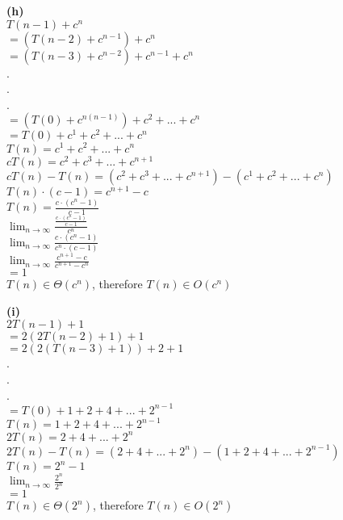 \documentclass[a4paper, 11pt]{article}
\renewcommand{\part}[1] {\vspace{.10in} {\bf (#1)}}
\begin{document}
\part{h}\\
$T(n-1)+c^{n}$\\
$=(T(n-2)+c^{n-1})+c^{n}$\\
$=(T(n-3)+c^{n-2})+c^{n-1}+c^{n}$\\
.\\
.\\
.\\
$=(T(0)+c^{n(n-1)})+c^{2}+...+c^{n}$\\
$=T(0)+c^{1}+c^{2}+...+c^{n}$\\
$T(n)=c^{1}+c^{2}+...+c^{n}$\\
$cT(n)=c^{2}+c^{3}+...+c^{n+1}$\\
$cT(n)-T(n)=(c^{2}+c^{3}+...+c^{n+1})-(c^{1}+c^{2}+...+c^{n})$\\
$T(n)\cdot (c-1)=c^{n+1}-c$\\
$T(n)=\frac{c \cdot (c^{n}-1)}{c-1}$\\
$\lim_{n\to\infty} \frac{\frac{c \cdot (c^{n}-1)}{c-1}}{c^{n}}$\\
$\lim_{n\to\infty} \frac{c\cdot (c^{n}-1)}{c^{n}\cdot (c-1)}$\\
$\lim_{n\to\infty} \frac{c^{n+1}-c}{c^{n+1}-c^{n}}$\\
$=1$\\
$T(n)\in\Theta(c^{n})$, therefore $T(n)\in O(c^{n})$

\part{i}\\
$2T(n-1)+1$\\
$=2(2T(n-2)+1)+1$\\
$=2(2(T(n-3)+1))+2+1$\\
.\\
.\\
.\\
$=T(0)+1+2+4+...+2^{n-1}$\\
$T(n)=1+2+4+...+2^{n-1}$\\
$2T(n)=2+4+...+2^{n}$\\
$2T(n)-T(n)=(2+4+...+2^{n})-(1+2+4+...+2^{n-1})$\\
$T(n)=2^{n}-1$\\
$\lim_{n\to\infty} \frac{2^{n}}{2^{n}}$\\
$=1$\\
$T(n)\in\Theta(2^{n})$, therefore $T(n)\in O(2^{n})$\\
\end{document}

